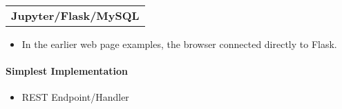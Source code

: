 \documentclass[11pt]{article}
\providecommand{\tightlist}{%
      \setlength{\itemsep}{0pt}\setlength{\parskip}{0pt}}
\begin{document}
\begin{longtable}[]{@{}c@{}}
\toprule
\tabularnewline
\midrule
\endhead
\textbf{Jupyter/Flask/MySQL}\tabularnewline
\bottomrule
\end{longtable}

    \begin{itemize}
\tightlist
\item
  In the earlier web page examples, the browser connected directly to
  Flask.
\end{itemize}

    \paragraph{Simplest Implementation}\label{simplest-implementation}

\begin{itemize}
\tightlist
\item
  REST Endpoint/Handler
\end{itemize}
\end{document}
